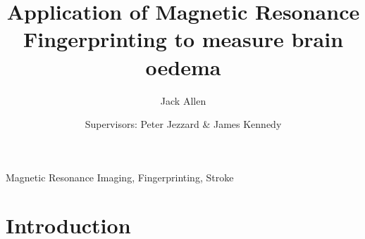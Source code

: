 \documentclass[review]{elsarticle}
\begin{document}
\begin{frontmatter}

\title{Application of Magnetic Resonance Fingerprinting to measure brain oedema}

\author{Jack Allen}
\author{Supervisors: Peter Jezzard \& James Kennedy}
\address{University of Oxford, Oxford, UK.}





\begin{abstract}

\end{abstract}


\begin{keyword}
Magnetic Resonance Imaging, Fingerprinting, Stroke
\end{keyword}

\end{frontmatter}


\section{Introduction}
\end{document}
